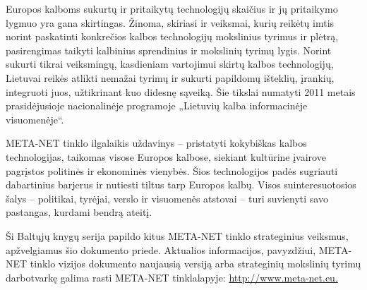 \begin{multicols}{2}

Europos kalboms sukurtų ir pritaikytų technologijų skaičius ir jų pritaikymo lygmuo yra gana skirtingas. Žinoma, skiriasi ir veiksmai, kurių reikėtų imtis norint paskatinti konkrečios kalbos technologijų mokslinius tyrimus ir plėtrą, pasirengimas taikyti kalbinius sprendinius ir mokslinių tyrimų lygis. Norint sukurti tikrai veiksmingų, kasdieniam vartojimui skirtų kalbos technologijų, Lietuvai reikės atlikti nemažai tyrimų ir sukurti papildomų išteklių, įrankių, integruoti juos, užtikrinant kuo didesnę sąveiką. Šie tikslai numatyti 2011 metais prasidėjusioje nacionalinėje programoje „Lietuvių kalba informacinėje visuomenėje“.

META-NET tinklo ilgalaikis uždavinys – pristatyti kokybiškas kalbos technologijas, taikomas visose Europos kalbose, siekiant kultūrine įvairove pagrįstos politinės ir ekonominės vienybės. Šios technologijos padės sugriauti dabartinius barjerus ir nutiesti tiltus tarp Europos kalbų. Visos suinteresuotosios šalys – politikai, tyrėjai, verslo ir visuomenės atstovai – turi suvienyti savo pastangas, kurdami bendrą ateitį.

Ši Baltųjų knygų serija papildo kitus META-NET tinklo strateginius veiksmus, apžvelgiamus šio dokumento priede. Aktualios informacijos, pavyzdžiui, META-NET tinklo vizijos dokumento naujausią versiją arba strateginių mokslinių tyrimų darbotvarkę galima rasti META-NET tinklalapyje: \url{http://www.meta-net.eu.}  
\end{multicols}

\clearpage



